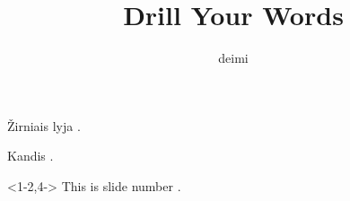 \documentclass{beamer}
\title[drill]{Drill Your Words}
\author{deimi}
\institute{}
\date{}
\begin{document}
\begin{frame}
  \titlepage
\end{frame}

\fm Žirniais lyja .

\fm Kandis .




\begin{frame}<1-2,4->
  This is slide number
  .
\end{frame}
\end{document}
